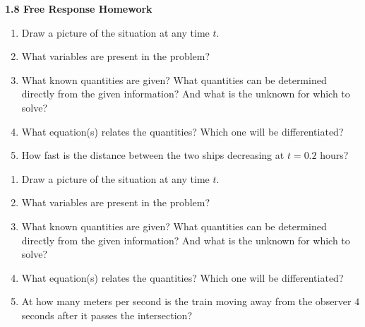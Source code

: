\newpage

\textbf{\large{1.8 Free Response Homework}}

\begin{enumerate}[label=\hspace{11pt}(\alph*), align=left, leftmargin=*, labelsep=0.25em]
    \item Draw a picture of the situation at any time $t$.
    \item What variables are present in the problem?
    \item What known quantities are given? What quantities can be determined directly from the given information? And what is the unknown for which to solve?
    \item What equation(s) relates the quantities? Which one will be differentiated?
    \item How fast is the distance between the two ships decreasing at $t = 0.2$ hours?
\end{enumerate} \vspace{11pt}

\begin{enumerate}[label=\hspace{11pt}(\alph*), align=left, leftmargin=*, labelsep=0.25em]
    \item Draw a picture of the situation at any time $t$.
    \item What variables are present in the problem?
    \item What known quantities are given? What quantities can be determined directly from the given information? And what is the unknown for which to solve?
    \item What equation(s) relates the quantities? Which one will be differentiated?
    \item At how many meters per second is the train moving away from the observer $4$ seconds after it passes the intersection?
\end{enumerate} \vspace{11pt}

